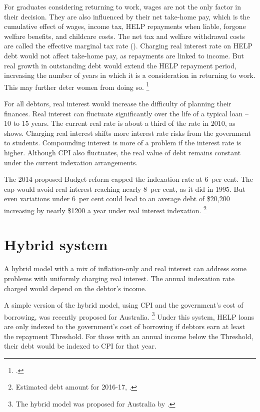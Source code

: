 \documentclass{grattan}
\begin{document}
For graduates considering returning to work, wages are not the only factor in their decision.
They are also influenced by their net take-home pay, which is the cumulative effect of wages, income tax, \gls{HELP} repayments when liable, forgone welfare benefits, and childcare costs.
The net tax and welfare withdrawal costs are called the effective marginal tax rate ().
Charging real interest rate on HELP debt would not affect take-home pay, as repayments are linked to income.
But real growth in outstanding debt would extend the \gls{HELP} repayment period, increasing the number of years in which it is a consideration in returning to work.
This may further deter women from doing so.%
\footcites[][Section~4.2.1]{Daley2012Gamechangerseconomic}{Commission2014Childcareearlychildhood}


For all debtors, real interest would increase the difficulty of planning their finances.
Real interest can fluctuate significantly over the life of a typical loan -- 10 to 15 years.
The current real rate is about a third of the rate in 2010, as  shows.
Charging real interest shifts more interest rate risks from the government to students.
Compounding interest is more of a problem if the interest rate is higher.
Although \gls{CPI} also fluctuates, the real value of debt remains constant under the current indexation arrangements.

The 2014 proposed Budget reform capped the indexation rate at 6~per cent.
The cap would avoid real interest reaching nearly 8~per cent, as it did in 1995.
But even variations under 6~per cent could lead to an average debt of \$20,200 increasing by nearly \$1200 a year under real interest indexation.%
   \footnote{Estimated debt amount for 2016-17, \textcite[][59]{Education2016Portfoliobudgetstatements}.}

\section{Hybrid system}\label{sec:hybrid-system}

A hybrid model with a mix of inflation-only and real interest can address some problems with uniformly charging real interest.
The annual indexation rate charged would depend on the debtor's income.

A simple version of the hybrid model, using \gls{CPI} and the government's cost of borrowing, was recently proposed for Australia.%
   \footnote{The hybrid model was proposed for Australia by \textcite{Chapman2014HELPinterestrate}.} Under this system, \gls{HELP} loans are only indexed to the government's cost of borrowing if debtors earn at least the repayment \gls{Threshold}.
For those with an annual income below the \gls{Threshold}, their debt would be indexed to \gls{CPI} for that year.
\end{document}
